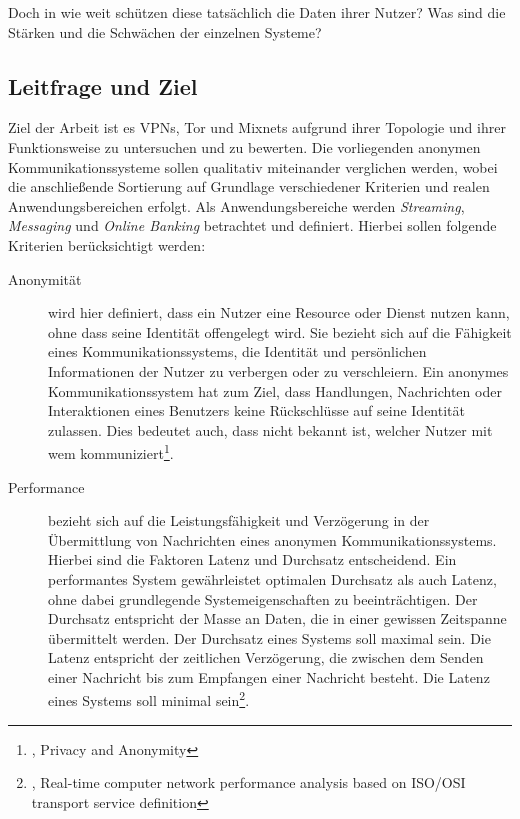 Doch in wie weit schützen diese tatsächlich die Daten ihrer Nutzer? Was sind die Stärken und die Schwächen der einzelnen Systeme? 

\vfill

\subsection{Leitfrage und Ziel}

Ziel der Arbeit ist es VPNs, Tor und Mixnets aufgrund ihrer Topologie und ihrer Funktionsweise zu untersuchen und zu bewerten. Die vorliegenden anonymen Kommunikationssysteme sollen qualitativ miteinander verglichen werden, wobei die anschließende Sortierung auf Grundlage verschiedener Kriterien und realen Anwendungsbereichen erfolgt. Als Anwendungsbereiche werden \textit{Streaming}, \textit{Messaging} und \textit{Online Banking} betrachtet und definiert. Hierbei sollen folgende Kriterien berücksichtigt werden:

\begin{description}
    \item[Anonymität] wird hier definiert, dass ein Nutzer eine Resource oder Dienst nutzen kann, ohne dass seine Identität offengelegt wird. Sie bezieht sich auf die Fähigkeit eines Kommunikationssystems, die Identität und persönlichen Informationen der Nutzer zu verbergen oder zu verschleiern. Ein anonymes Kommunikationssystem hat zum Ziel, dass Handlungen, Nachrichten oder Interaktionen eines Benutzers keine Rückschlüsse auf seine Identität zulassen. Dies bedeutet auch, dass nicht bekannt ist, welcher Nutzer mit wem kommuniziert\footnote{\cite{DefinitionOfAnonymity}, Privacy and Anonymity}.

    \item[Performance] bezieht sich auf die Leistungsfähigkeit und Verzögerung in der Übermittlung von Nachrichten eines anonymen Kommunikationssystems. Hierbei sind die Faktoren Latenz und Durchsatz entscheidend. Ein performantes System gewährleistet optimalen Durchsatz als auch Latenz, ohne dabei grundlegende Systemeigenschaften zu beeinträchtigen. Der Durchsatz entspricht der Masse an Daten, die in einer gewissen Zeitspanne übermittelt werden. Der Durchsatz eines Systems soll maximal sein. Die Latenz entspricht der zeitlichen Verzögerung, die zwischen dem Senden einer Nachricht bis zum Empfangen einer Nachricht besteht. Die Latenz eines Systems soll minimal sein\footnote{\cite{ComputerNetworkPerformanceAnalysis}, Real-time computer network performance analysis based on ISO/OSI transport service definition}.
\end{description}
